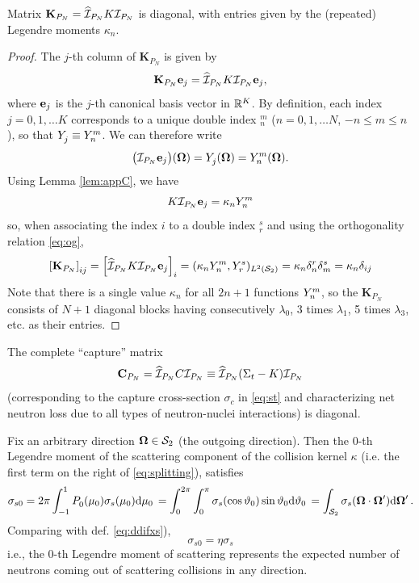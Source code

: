 \begin{corollary}
	Matrix $\mathbf{K}_{P_N} = \PihPN K \PiPN$ is diagonal, with entries given by the (repeated) Legendre moments $\kappa_n$.
\end{corollary}
\begin{proof}
	The $j$-th column of $\mathbf{K}_{P_N}$ is given by
	$$
		\mathbf{K}_{P_N}\mat{e}_j = \PihPN K \PiPN \mat{e}_j,
	$$
	where $\mat{e}_j$ is the $j$-th canonical basis vector in $\R[K]$. By definition, each index \mbox{$j = 0,1,\ldots K$}
	corresponds to a unique double index ${}_n^m$ ($n = 0,1,\ldots N$, \linebreak$-n \leq m \leq n$), so that $\Y{j}{}
	\equiv \Y{n}{m}$.
	We can therefore write 
	$$
		\bigl(\PiPN \mat{e}_j\bigr)(\bomega) = \Y{j}{}(\bomega) = Y_n^m(\bomega).
	$$
	Using Lemma \ref{lem:appC}, we have 
	$$
		K \PiPN \mat{e}_j = \kappa_n \Y{n}{m}
	$$
	so, when associating the index $i$ to a double index ${}_r^s$ and using the orthogonality relation \eqref{eq:og},
	$$
	\left[\mathbf{K}_{P_N}\right]_{ij} = \left[\PihPN K \PiPN \mat{e}_j\right]_i = (\kappa_n \Y{n}{m},
		\Y{r}{s})_{\Lp[2](\Sphere)} = \kappa_n\delta_{n}^{r}\delta_{m}^{s} = \kappa_n\kron{i}{j}
	$$
	Note that there is a single value $\kappa_n$ for all $2n + 1$ functions  $\Y{n}{m}$, so the $\mathbf{K}_{P_N}$ consists of
	$N+1$ diagonal blocks having consecutively $\lambda_0$, 3 times $\lambda_1$, 5 times $\lambda_3$, etc.  as their
	entries.
\end{proof}
\begin{corollary}
The complete ``capture'' matrix 
$$
	\mat{C}_{P_N} = \PihPN C \PiPN \equiv \PihPN (\Sigma_t - K) \PiPN 
$$
(corresponding to the capture cross-section $\sigma_c$ in \eqref{eq:st} and characterizing net neutron loss due to
all types of neutron-nuclei interactions) is diagonal.
\end{corollary}
\vspace*{1em}
\begin{remark}\label{rem:app:c}
	Fix an arbitrary direction $\bomega\in\Sphere$ (the outgoing direction). Then the $0$-th Legendre moment of the
	scattering component of the collision kernel $\kappa$ (i.e. the first term on the right of \eqref{eq:splitting}), satisfies 
	$$
		\sigma_{s0} = 2\pi \muint[_0]{\P{0}{}(\mu_0)\sigma_s(\mu_0)} = \int_{0}^{2\pi} \int_{0}^{\pi}
		\sigma_s(\cos \polar_0) \sin \polar_0\d{\polar_0} = 
		\int_{\Sphere} \sigma_s(\bomega\cdot\bomega') \d{\bomega'}.
	$$
	Comparing with def. \eqref{eq:ddifxs}), 
	$$
		\sigma_{s0} = \eta\sigma_s
	$$
	i.e., the $0$-th Legendre moment of scattering represents the expected number of neutrons coming out of 
	scattering collisions in any direction.
\end{remark} 

